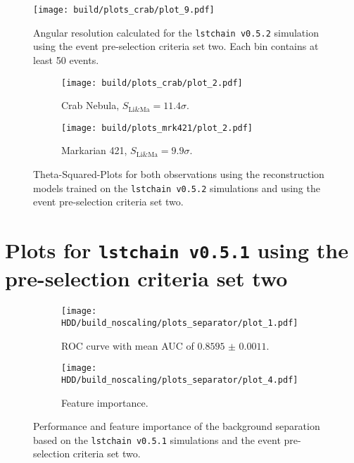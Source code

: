 \begin{figure}
    \centering
    \texttt{[image: build/plots\_crab/plot\_9.pdf]}
    \caption{Angular resolution calculated for the \texttt{lstchain v0.5.2} simulation using the event pre-selection criteria set two.
        Each bin contains at least 50 events.
    }
    \label{fig:ang_res_newMC_150}
\end{figure}

\begin{figure}
    \centering
    \begin{subfigure}{0.49\textwidth}
        \centering
        \texttt{[image: build/plots\_crab/plot\_2.pdf]}
        \caption{Crab Nebula, $S_\text{Li\&Ma} = \num{11.4} \sigma$.}
        \label{fig:crab_newMC_150}
    \end{subfigure}
    \hfill
    \begin{subfigure}{0.49\textwidth}
        \centering
        \texttt{[image: build/plots\_mrk421/plot\_2.pdf]}
        \caption{Markarian 421, $S_\text{Li\&Ma} = \num{9.9} \sigma$.}
        \label{fig:mrk_newMC_150}
    \end{subfigure}
    \caption{Theta-Squared-Plots for both observations using the reconstruction models trained on the \texttt{lstchain v0.5.2} simulations and using 
        the event pre-selection criteria set two.
    }
    \label{fig:obs_newMC_150}
\end{figure}



\section{Plots for \texttt{lstchain v0.5.1} using the pre-selection criteria set two}
\begin{figure}
    \centering
    \begin{subfigure}{0.49\textwidth}
        \centering
        \texttt{[image: HDD/build\_noscaling/plots\_separator/plot\_1.pdf]}
        \caption{ROC curve with mean AUC of $\num{0.8595(11)}$.}
        \label{fig:separator_oldMC_150}
    \end{subfigure}
    \hfill
    \begin{subfigure}{0.49\textwidth}
        \centering
        \texttt{[image: HDD/build\_noscaling/plots\_separator/plot\_4.pdf]}
        \caption{Feature importance.}
        \label{fig:separator_oldMC_150_feature}
    \end{subfigure}
    \caption{Performance and feature importance of the background separation based on the \texttt{lstchain v0.5.1} simulations and the event pre-selection criteria set two.}
\end{figure}

